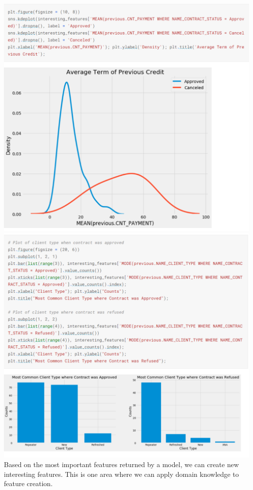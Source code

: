 \documentclass[twoside,a4paper]{article}
\begin{document}
\includegraphics[scale=.8]{24.png}\\
\includegraphics[scale=.8]{25.png}\\
Based on the most important features returned by a model, we can create new interesting features. This is one area where we can apply domain knowledge to feature creation.
\end{document}
